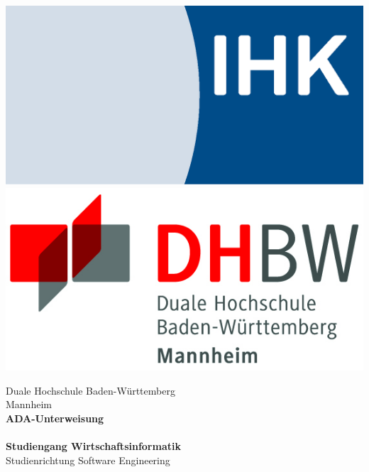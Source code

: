 \begin{titlepage}
\begin{minipage}{\textwidth}
		\vspace{-2cm}
		\noindent \includegraphics[scale=0.25]{img/ihk.eps} \hfill   \includegraphics[scale=0.79]{img/logo.jpg}
\end{minipage}
\vspace{1em}
\sffamily
\begin{center}
	\textsf{\large{}Duale Hochschule Baden-W\"urttemberg\\[1.5mm] Mannheim}\\[2em]
	\textsf{\textbf{\Large{}ADA-Unterweisung }}\\[3mm]
	\textsf{\textbf{\DerTitelDerArbeit}} \\[1.5cm]
	\textsf{\textbf{\Large{}Studiengang Wirtschaftsinformatik}\\[3mm] \textsf{Studienrichtung Software Engineering}}
	
	\vspace{3em}
\vfill

\begin{minipage}{\textwidth}


\end{minipage}
\end{center}
\end{titlepage}
